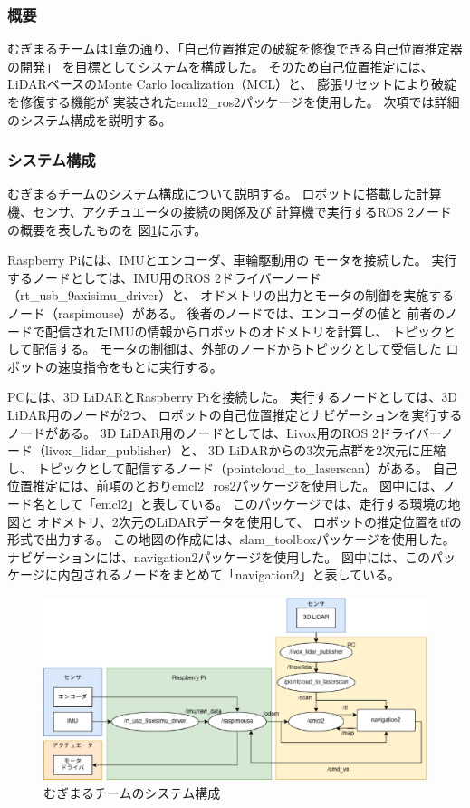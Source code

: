 \subsubsection{概要}
むぎまるチームは1章の通り、「自己位置推定の破綻を修復できる自己位置推定器の開発」
を目標としてシステムを構成した。
そのため自己位置推定には、LiDARベースのMonte Carlo localization（MCL）\cite{fox1999etal}と、
膨張リセット\cite{ueda2004iros}により破綻を修復する機能が
実装されたemcl2\_ros2パッケージ\cite{emcl2_ros2}を使用した。
次項では詳細のシステム構成を説明する。
\subsubsection{システム構成}
むぎまるチームのシステム構成について説明する。
ロボットに搭載した計算機、センサ、アクチュエータの接続の関係及び
計算機で実行するROS 2ノードの概要を表したものを
図\ref{fig:mugimaru_system}に示す。

Raspberry Piには、IMUとエンコーダ、車輪駆動用の
モータを接続した。
実行するノードとしては、IMU用のROS 2ドライバーノード（rt\_usb\_9axisimu\_driver）と、
オドメトリの出力とモータの制御を実施するノード（raspimouse）がある。
後者のノードでは、エンコーダの値と
前者のノードで配信されたIMUの情報からロボットのオドメトリを計算し、
トピックとして配信する。
モータの制御は、外部のノードからトピックとして受信した
ロボットの速度指令をもとに実行する。

PCには、3D LiDARとRaspberry Piを接続した。
実行するノードとしては、3D LiDAR用のノードが2つ、
ロボットの自己位置推定とナビゲーションを実行するノードがある。
3D LiDAR用のノードとしては、Livox用のROS 2ドライバーノード（livox\_lidar\_publisher）と、
3D LiDARからの3次元点群を2次元に圧縮し、
トピックとして配信するノード（pointcloud\_to\_laserscan）がある。
自己位置推定には、前項のとおりemcl2\_ros2パッケージ\cite{emcl2_ros2}を使用した。
図中には、ノード名として「emcl2」と表している。
このパッケージでは、走行する環境の地図と
オドメトリ、2次元のLiDARデータを使用して、
ロボットの推定位置をtfの形式で出力する。
この地図の作成には、slam\_toolboxパッケージ\cite{slam_toolbox}を使用した。
ナビゲーションには、navigation2パッケージ\cite{nav2}を使用した。
図中には、このパッケージに内包されるノードをまとめて「navigation2」と表している。

\begin{figure}[h]
  \begin{center}
    \includegraphics[width=1.0\linewidth]{figs/mugimaru_system_2024.eps}
    \caption{むぎまるチームのシステム構成}
    \label{fig:mugimaru_system}
  \end{center}
\end{figure}

